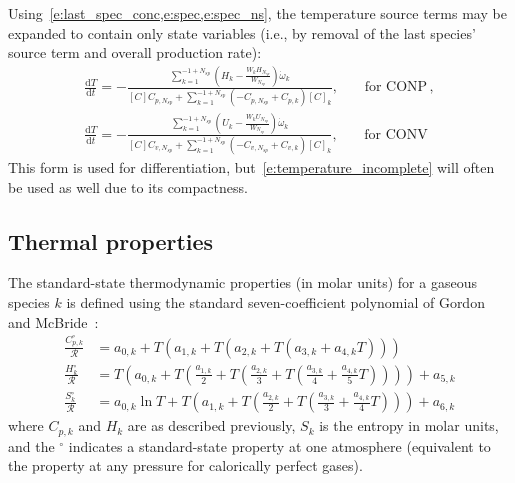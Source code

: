 \documentclass[12pt]{article}
\newcommand{\ns}{\ensuremath{{N_{sp}}}}
\newcommand{\conp}{CONP}
\newcommand{\conv}{CONV}
\newcommand{\dconp}{\ensuremath{,\qquad\text{for \conp}}}
\newcommand{\dconv}{\ensuremath{,\qquad\text{for \conv}}}
\begin{document}
Using~\cref{e:last_spec_conc,e:spec,e:spec_ns}, the temperature source terms may be expanded to contain only state variables (i.e., by removal of the last species' source term and overall production rate):
\begin{subequations}
\label{e:temperature_complete}
\begin{align}
\frac{\text{d} T }{\text{d} t } = - \frac{\sum_{k=1}^{-1 + \ns} \left(H_{k} - \frac{W_{k} H_{\ns}}{W_{\ns}}\right) \dot{\omega}_{k}}{[C] {C_{p,\ns}} + \sum_{k=1}^{-1 + \ns} \left(- {C_{p,\ns}} + {C_{p, k}}\right) [C]_{k}}\dconp,\\
\frac{\text{d} T }{\text{d} t } = - \frac{\sum_{k=1}^{-1 + \ns} \left(U_{k} - \frac{W_{k} U_{\ns}}{W_{\ns}}\right) \dot{\omega}_{k}}{[C] {C_{v,\ns}} + \sum_{k=1}^{-1 + \ns} \left(- {C_{v,\ns}} + {C_{v, k}}\right) [C]_{k}}\dconv
\end{align}
\end{subequations}
This form is used for differentiation, but~\cref{e:temperature_incomplete} will often be used as well due to its compactness.

\subsection{Thermal properties}
The standard-state thermodynamic properties (in molar units) for a gaseous species $k$ is defined using the standard seven-coefficient polynomial of Gordon and McBride~\cite{gordon1994computer}:
\begin{align}
\frac{C_{p,k}^{\circ}}{\mathcal{R}} &= a_{0,k} + T \left( a_{1,k} + T \left( a_{2,k} + T \left( a_{3,k} + a_{4,k} T \right) \right) \right) \label{e:cpk} \\
\frac{H_k^{\circ}}{\mathcal{R}} &= T \left( a_{0,k} + T \left( \frac{a_{1,k}}{2} + T \left( \frac{a_{2,k}}{3} + T \left( \frac{a_{3,k}}{4} + \frac{a_{4,k}}{5} T \right) \right) \right) \right) + a_{5,k} \label{e:hk} \\
\frac{S_k^{\circ}}{\mathcal{R}} &= a_{0,k} \ln T + T \left( a_{1,k} + T \left( \frac{a_{2,k}}{2} + T \left( \frac{a_{3,k}}{3} + \frac{a_{4,k}}{4} T \right) \right) \right) + a_{6,k} \label{e:sk}
\end{align}
where $C_{p,k}$ and $H_k$ are as described previously, $S_k$ is the entropy in molar units, and the ${}^{\circ}$ indicates a standard-state property at one atmosphere (equivalent to the property at any pressure for calorically perfect gases).
\end{document}
